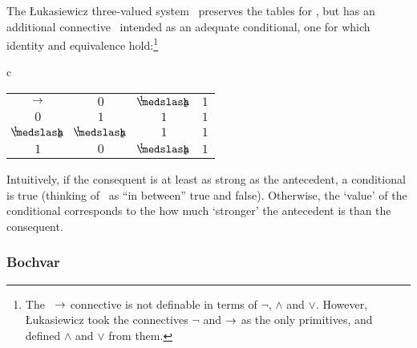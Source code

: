 	The \L ukasiewicz three-valued system \Lthree\ preserves the tables for \Kthree, but has an additional connective \arrow\ intended as an adequate conditional, one for which identity and equivalence hold:\footnote{The \Lthree\ $\rightarrow$ connective is not definable in terms of $\neg$, $\wedge$ and $\vee$. However, \L ukasiewicz took the connectives $\neg$ and $\rightarrow$ as the only primitives, and defined $\wedge$ and $\vee$ from them.}
\begin{singlespace}	
	\begin{longtable}{c}
		\begin{tabular}{c | c c c}
			$\rightarrow$ 	&	$0$			&	$\oneHalf$	&	$1$ \\
			\cline{1-4}
			$0$			&	$1$			&	$1$			&	$1$ \\
			$\oneHalf$	&	$\oneHalf$	&	$1$			&	$1$ \\
			$1$			&	$0$			&	$\oneHalf$	&	$1$
		\end{tabular}
	\end{longtable}
\end{singlespace}	
\noindent Intuitively, if the consequent is at least as strong as the antecedent, a conditional is true (thinking of \oneHalf\ as ``in between'' true and false). Otherwise, the `value' of the conditional corresponds to the how much `stronger' the antecedent is than the consequent. 
		
	\subsubsection{Bochvar}\label{bochvar}
	
